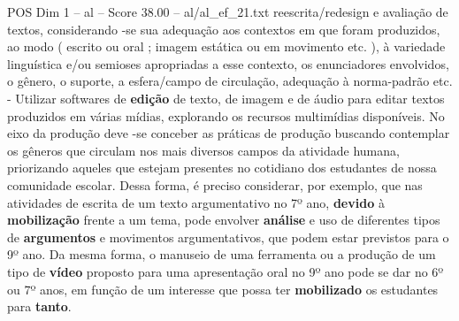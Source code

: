 \begin{textsample}{POS Dim 1 – al – Score 38.00 – al/al\_ef\_21.txt}
reescrita/redesign e avaliação de textos, considerando -se sua adequação aos contextos em que foram produzidos, ao modo ( escrito ou oral ; imagem estática ou em movimento etc. ), à variedade linguística e/ou semioses apropriadas a esse contexto, os enunciadores envolvidos, o gênero, o suporte, a esfera/campo de circulação, adequação à norma-padrão etc. - Utilizar softwares de \textbf{edição} de texto, de imagem e de áudio para editar textos produzidos em várias mídias, explorando os recursos multimídias disponíveis.
No eixo da produção deve -se conceber as práticas de produção buscando contemplar os gêneros que circulam nos mais diversos campos da atividade humana, priorizando aqueles que estejam presentes no cotidiano dos estudantes de nossa comunidade escolar.
Dessa forma, é preciso considerar, por exemplo, que nas atividades de escrita de um texto argumentativo no 7º ano, \textbf{devido} à \textbf{mobilização} frente a um tema, pode envolver \textbf{análise} e uso de diferentes tipos de \textbf{argumentos} e movimentos argumentativos, que podem estar previstos para o 9º ano.
Da mesma forma, o manuseio de uma ferramenta ou a produção de um tipo de \textbf{vídeo} proposto para uma apresentação oral no 9º ano pode se dar no 6º ou 7º anos, em função de um interesse que possa ter \textbf{mobilizado} os estudantes para \textbf{tanto}.

\end{textsample}
